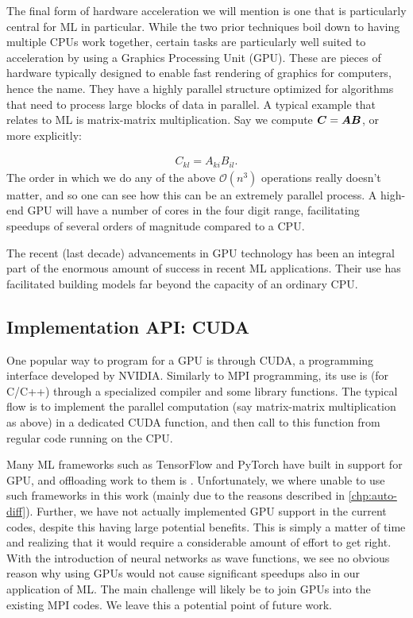\documentclass[Thesis.tex]{subfiles}
\begin{document}
The final form of hardware acceleration we will mention is one that is
particularly central for ML in particular. While the two prior techniques boil
down to having multiple CPUs work together, certain tasks are particularly well
suited to acceleration by using a Graphics Processing Unit (GPU). These are
pieces of hardware typically designed to enable fast rendering of graphics for
computers, hence the name. They have a highly parallel structure optimized for
algorithms that need to process large blocks of data in parallel. A typical
example that relates to ML is matrix-matrix multiplication. Say we compute $\bm{C} = \bm{A} \bm{B}$, or more explicitly:

\begin{align}
  C_{kl} = A_{ki}B_{il}.
\end{align}
The order in which we do any of the above $\mathcal{O}(n^3)$ operations really
doesn't matter, and so one can see how this can be an extremely parallel
process. A high-end GPU will have a number of cores in the four digit range,
facilitating speedups of several orders of magnitude compared to a CPU.

The recent (last decade) advancements in GPU technology has been an integral
part of the enormous amount of success in recent ML applications. Their use has
facilitated building models far beyond the capacity of an ordinary CPU.

\subsection{Implementation API: CUDA}

One popular way to program for a GPU is through CUDA, a programming
interface developed by NVIDIA. Similarly to MPI programming, its use is (for
C/C++) through a specialized compiler and some library functions. The typical
flow is to implement the parallel computation (say matrix-matrix multiplication
as above) in a dedicated CUDA function, and then call to this function from
regular code running on the CPU.

Many ML frameworks such as TensorFlow and PyTorch have built in support for GPU,
and offloading work to them is . Unfortunately, we where unable to
use such frameworks in this work (mainly due to the reasons described in
\cref{chp:auto-diff}). Further, we have not actually implemented GPU support in
the current codes, despite this having large potential benefits. This is simply
a matter of time and realizing that it would require a considerable amount of effort
to get right. With the introduction of neural networks as wave functions, we see
no obvious reason why using GPUs would not cause significant speedups also in
our application of ML. The main challenge will likely be to join GPUs into the
existing MPI codes. We leave this a potential point of future work.
\end{document}
